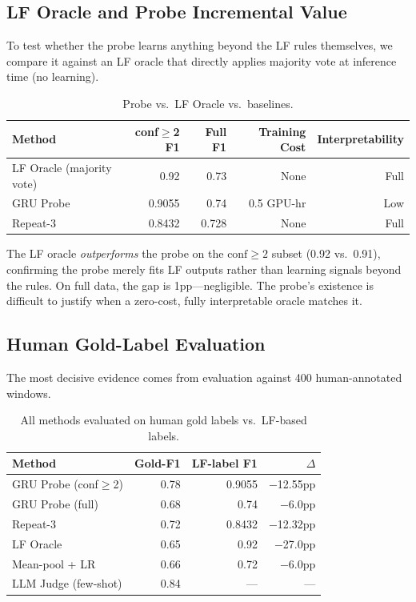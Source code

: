 \documentclass[11pt]{article}
\begin{document}
\subsection{LF Oracle and Probe Incremental Value}
\label{sec:oracle}

To test whether the probe learns anything beyond the LF rules themselves, we compare it against an LF oracle that directly applies majority vote at inference time (no learning).

\begin{table}[h]
\centering
\caption{Probe vs.\ LF Oracle vs.\ baselines.}
\label{tab:oracle}
\begin{tabular}{lrrrr}
\toprule
\textbf{Method} & \textbf{conf$\geq$2 F1} & \textbf{Full F1} & \textbf{Training Cost} & \textbf{Interpretability} \\
\midrule
LF Oracle (majority vote) & 0.92 & 0.73 & None & Full \\
GRU Probe & 0.9055 & 0.74 & 0.5 GPU-hr & Low \\
Repeat-3 & 0.8432 & 0.728 & None & Full \\
\bottomrule
\end{tabular}
\end{table}

The LF oracle \emph{outperforms} the probe on the $\text{conf}\!\geq\!2$ subset (0.92 vs.\ 0.91), confirming the probe merely fits LF outputs rather than learning signals beyond the rules.
On full data, the gap is 1pp---negligible.
The probe's existence is difficult to justify when a zero-cost, fully interpretable oracle matches it.

\subsection{Human Gold-Label Evaluation}
\label{sec:human_gold}

The most decisive evidence comes from evaluation against 400 human-annotated windows.

\begin{table}[h]
\centering
\caption{All methods evaluated on human gold labels vs.\ LF-based labels.}
\label{tab:gold}
\begin{tabular}{lrrr}
\toprule
\textbf{Method} & \textbf{Gold-F1} & \textbf{LF-label F1} & \textbf{$\Delta$} \\
\midrule
GRU Probe (conf$\geq$2) & 0.78 & 0.9055 & $-$12.55pp \\
GRU Probe (full) & 0.68 & 0.74 & $-$6.0pp \\
Repeat-3 & 0.72 & 0.8432 & $-$12.32pp \\
LF Oracle & 0.65 & 0.92 & $-$27.0pp \\
Mean-pool + LR & 0.66 & 0.72 & $-$6.0pp \\
LLM Judge (few-shot) & 0.84 & --- & --- \\
\bottomrule
\end{tabular}
\end{table}
\end{document}
